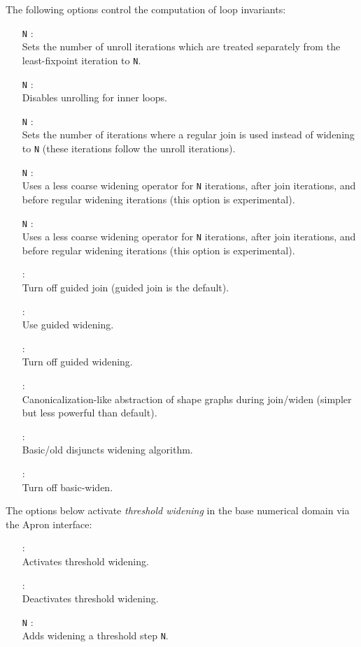 The following options control the computation of loop invariants:
\begin{itemize}
\item[\doption{-unrolls} \texttt{N}]: \\
  Sets the number of unroll iterations which are treated separately
  from the least-fixpoint iteration to \texttt{N}.
\item[\doption{-no-unroll-in} \texttt{N}]: \\
  Disables unrolling for inner loops.
\item[\doption{-j-iters} \texttt{N}]: \\
  Sets the number of iterations where a regular join is used instead
  of widening to \texttt{N} (these iterations follow the unroll
  iterations).
\item[\doption{-dw-iters} \texttt{N}] \optdev: \\
  Uses a less coarse widening operator for \texttt{N} iterations, after
  join iterations, and before regular widening iterations (this option
  is experimental).
\item[\doption{-dw-iters} \texttt{N}] \optdev: \\
  Uses a less coarse widening operator for \texttt{N} iterations, after
  join iterations, and before regular widening iterations (this option
  is experimental).
\item[\doption{-no-guided-join}] \optdev: \\
  Turn off guided join (guided join is the default).
\item[\doption{-guided-widen}] \optdev: \\
  Use guided widening.
\item[\doption{-no-guided-widen}] \optdev: \\
  Turn off guided widening.
\item[\doption{-widen-can}] \optdev: \\
  Canonicalization-like abstraction of shape graphs during join/widen
  (simpler but less powerful than default).
\item[\doption{-basic-widen}] \optdev: \\
  Basic/old disjuncts widening algorithm.
\item[\doption{-no-basic-widen}] \optdev: \\
  Turn off basic-widen.
\end{itemize}

The options below activate {\em threshold widening} in the base
numerical domain via the Apron interface:
\begin{itemize}
\item[\doption{-w-thr}]: \\
  Activates threshold widening.
\item[\doption{-w-no-thr}]: \\
  Deactivates threshold widening.
\item[\doption{-w-add-thr} \texttt{N}]: \\
  Adds widening a threshold step \texttt{N}.
\end{itemize}

